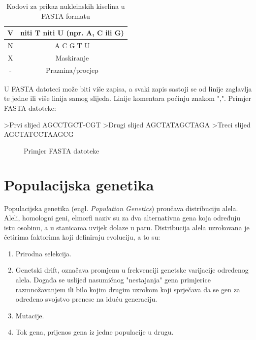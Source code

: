 \documentclass[times, utf8, zavrsni, numeric]{fer}
\begin{document}
\begin{table}[h]
\begin{tabular}{|c|c|}
		V                                                                              & niti T niti U (npr. A, C ili G) \\ \hline
		N                                                                              & A C G T U                       \\ \hline
		X                                                                              & Maskiranje                      \\ \hline
		-                                                                              & Praznina/procjep                \\ \hline
	\end{tabular}
\caption{Kodovi za prikaz nukleinskih kiselina u FASTA formatu}
\label{fastaTablica}
\end{table}

U FASTA datoteci može biti više zapisa, a svaki zapis sastoji se od linije zaglavlja te jedne ili više linija samog slijeda. Linije komentara poćinju znakom ",". Primjer FASTA datoteke: 

\begin{verbbox}
>Prvi slijed
AGCCTGCT-CGT
>Drugi slijed
AGCTATAGCTAGA
>Treci slijed
AGCTATCCTAAGCG
\end{verbbox}
\begin{figure}[ht]
	\centering
	\theverbbox
	\caption{Primjer FASTA datoteke}
\end{figure}

\section{Populacijska genetika}
Populacijska genetika (engl. \textit{Population Genetics}) proučava distribuciju alela. Aleli, homologni geni, elmorfi naziv su za dva alternativna gena koja određuju istu osobinu, a u stanicama  uvijek dolaze u paru. Distribucija alela uzrokovana je četirima faktorima koji definiraju evoluciju, a to su: 
\begin{enumerate}
	\item Prirodna selekcija.
	\item Genetski drift, označava promjenu u frekvenciji genetske varijacije određenog alela. Događa se uslijed nasumičnog "nestajanja" gena primjerice razmnožavanjem ili bilo kojim drugim uzrokom koji sprječava da se gen za određeno svojstvo prenese na iduću generaciju.
	\item Mutacije.
	\item Tok gena, prijenos gena iz jedne populacije u drugu.
\end{enumerate}
\end{document}
